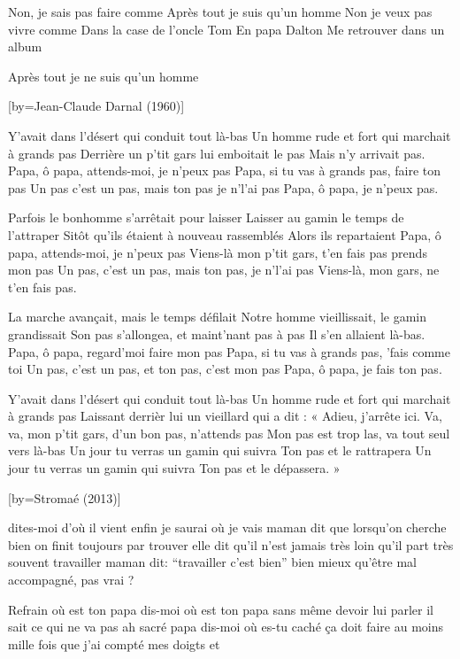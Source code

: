 \beginverse
Non, je sais pas faire comme
Après tout je suis qu'un homme
Non je veux pas vivre comme
Dans la case de l'oncle Tom
En papa Dalton
Me retrouver dans un album
\endverse

\beginverse
Après tout je ne suis qu'un homme
\endverse

[by={Jean-Claude Darnal (1960)}]

\beginverse
Y'avait dans l'désert qui conduit tout là-bas
Un homme rude et fort qui marchait à grands pas
Derrière un p'tit gars lui emboitait le pas
Mais n'y arrivait pas.
Papa, ô papa, attends-moi, je n'peux pas
Papa, si tu vas à grands pas, faire ton pas
Un pas c'est un pas, mais ton pas je n'l'ai pas
Papa, ô papa, je n'peux pas.
\endverse

\beginverse
Parfois le bonhomme s'arrêtait pour laisser
Laisser au gamin le temps de l'attraper
Sitôt qu'ils étaient à nouveau rassemblés
Alors ils repartaient
Papa, ô papa, attends-moi, je n'peux pas
Viens-là mon p'tit gars, t'en fais pas prends mon pas
Un pas, c'est un pas, mais ton pas, je n'l'ai pas
Viens-là, mon gars, ne t'en fais pas.
\endverse

\beginverse
La marche avançait, mais le temps défilait Notre homme vieillissait, le gamin grandissait Son pas s'allongea, et maint'nant pas à pas
Il s'en allaient là-bas.
Papa, ô papa, regard'moi faire mon pas
Papa, si tu vas à grands pas, 'fais comme toi
Un pas, c'est un pas, et ton pas, c'est mon pas
Papa, ô papa, je fais ton pas.
\endverse

\beginverse
Y'avait dans l'désert qui conduit tout là-bas
Un homme rude et fort qui marchait à grands pas
Laissant derrièr lui un vieillard qui a dit :
« Adieu, j'arrête ici.
Va, va, mon p'tit gars, d'un bon pas, n'attends pas
Mon pas est trop las, va tout seul vers là-bas
Un jour tu verras un gamin qui suivra
Ton pas et le rattrapera
Un jour tu verras un gamin qui suivra
Ton pas et le dépassera. »
\endverse

[by={Stromaé (2013)}]

\beginverse
dites-moi d’où il vient
enfin je saurai où je vais
maman dit que lorsqu’on cherche bien
on finit toujours par trouver
elle dit qu’il n’est jamais très loin
qu’il part très souvent travailler
maman dit: “travailler c’est bien”
bien mieux qu’être mal accompagné, pas vrai ?
\endverse

\beginverse
Refrain
où est ton papa
dis-moi où est ton papa
sans même devoir lui parler il sait ce qui ne va pas
ah sacré papa
dis-moi où es-tu caché
ça doit faire au moins mille fois
que j’ai compté mes doigts et
\endverse

